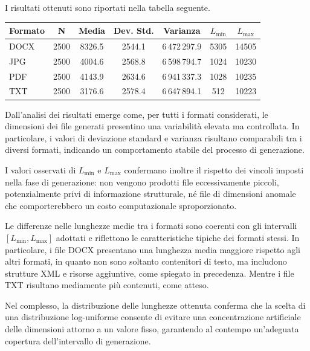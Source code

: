 \documentclass{report}
\begin{document}
I risultati ottenuti sono riportati nella tabella seguente.

\bigskip

{\centering
{}
\label{tab:file_length_stats}
\begin{tabular}{lcccccc}
\toprule
\textbf{Formato} & \textbf{N} & \textbf{Media} & \textbf{Dev. Std.} & \textbf{Varianza} & \textbf{$L_{\min}$} & \textbf{$L_{\max}$} \\
\midrule
DOCX & 2500 & 8326.5 & 2544.1 & 6\,472\,297.9 & 5305 & 14505 \\
JPG  & 2500 & 4004.6 & 2568.8 & 6\,598\,794.7 & 1024 & 10230 \\
PDF  & 2500 & 4143.9 & 2634.6 & 6\,941\,337.3 & 1028 & 10235 \\
TXT  & 2500 & 3176.6 & 2578.4 & 6\,647\,894.1 & 512  & 10223 \\
\bottomrule
\end{tabular}
\par}



\bigskip

Dall’analisi dei risultati emerge come, per tutti i formati considerati, le
dimensioni dei file generati presentino una variabilità elevata ma controllata.
In particolare, i valori di deviazione standard e varianza risultano comparabili
tra i diversi formati, indicando un comportamento stabile del processo di
generazione.

\bigskip

I valori osservati di $L_{\min}$ e $L_{\max}$ confermano inoltre il rispetto dei
vincoli imposti nella fase di generazione: non vengono prodotti file
eccessivamente piccoli, potenzialmente privi di informazione strutturale, né
file di dimensioni anomale che comporterebbero un costo computazionale
sproporzionato.

\bigskip

Le differenze nelle lunghezze medie tra i formati sono coerenti con gli
intervalli $[L_{\min}, L_{\max}]$ adottati e riflettono le caratteristiche tipiche
dei formati stessi. In particolare, i file DOCX presentano una lunghezza media
maggiore rispetto agli altri formati, in quanto non sono soltanto 
contenitori di testo, ma includono strutture XML e risorse aggiuntive, come spiegato in precedenza.
Mentre i file TXT risultano mediamente più contenuti, come atteso.

\bigskip

Nel complesso, la distribuzione delle lunghezze ottenuta conferma che la scelta
di una distribuzione log-uniforme consente di evitare una concentrazione
artificiale delle dimensioni attorno a un valore fisso, garantendo al contempo
un’adeguata copertura dell’intervallo di generazione.
\end{document}
